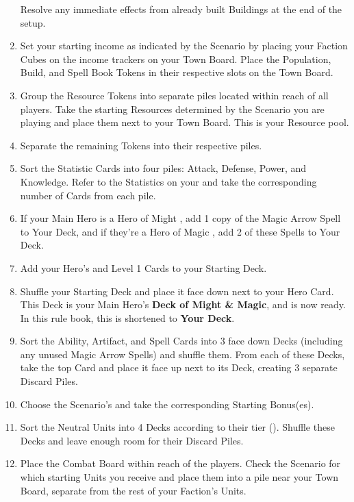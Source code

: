 \begin{multicols*}{2}
\begin{enumerate}
    Resolve any immediate effects from already built Buildings at the end of the setup.
  \item Set your starting income as indicated by the Scenario by placing your Faction Cubes on the income trackers on your Town Board.
    Place the Population, Build, and Spell Book Tokens in their respective slots on the Town Board.
  \item Group the Resource Tokens into separate piles located within reach of all players.
    Take the starting Resources determined by the Scenario you are playing and place them next to your Town Board.
    This is your Resource pool.
  \item Separate the remaining Tokens into their respective piles.
  \item Sort the Statistic Cards into four piles: Attack, Defense, Power, and Knowledge.
    Refer to the Statistics on your  and take the corresponding number of Cards from each pile.
  \item If your Main Hero is a Hero of Might , add 1 copy of the Magic Arrow Spell to Your Deck, and if they’re a Hero of Magic , add 2 of these Spells to Your Deck.
  \item Add your Hero's  and Level 1  Cards to your Starting Deck.
  \item Shuffle your Starting Deck and place it face down next to your Hero Card.
    This Deck is your Main Hero's \textbf{Deck of Might \& Magic}, and is now ready. In this rule book, this is shortened to \textbf{Your Deck}.
  \item Sort the Ability, Artifact, and Spell Cards into 3 face down Decks (including any unused Magic Arrow Spells) and shuffle them.
    From each of these Decks, take the top Card and place it face up next to its Deck, creating 3 separate Discard Piles.
  \item Choose the Scenario's  and take the corresponding Starting Bonus(es).
  \item Sort the Neutral Units into 4 Decks according to their tier ().
    Shuffle these Decks and leave enough room for their Discard Piles.
  \item Place the Combat Board within reach of the players.
    Check the Scenario for which starting Units you receive and place them into a pile near your Town Board, separate from the rest of your Faction’s Units.

\end{enumerate}
\end{multicols*}

